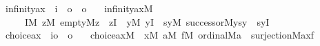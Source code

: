 \begin{isabellebody}
\isanewline
\isanewline
{}\isamarkupfalse%
\isanewline
\ \ infinity{\isacharunderscore}{\kern0pt}ax\ {\isacharcolon}{\kern0pt}{\isacharcolon}{\kern0pt}\ {\isachardoublequoteopen}{\isacharparenleft}{\kern0pt}i\ {\isasymRightarrow}\ o{\isacharparenright}{\kern0pt}\ {\isasymRightarrow}\ o{\isachardoublequoteclose}\ \isanewline
\ \ {\isachardoublequoteopen}infinity{\isacharunderscore}{\kern0pt}ax{\isacharparenleft}{\kern0pt}M{\isacharparenright}{\kern0pt}\ {\isasymequiv}\isanewline
\ \ \ \ \ \ {\isacharparenleft}{\kern0pt}{\isasymexists}I{\isacharbrackleft}{\kern0pt}M{\isacharbrackright}{\kern0pt}{\isachardot}{\kern0pt}\ {\isacharparenleft}{\kern0pt}{\isasymexists}z{\isacharbrackleft}{\kern0pt}M{\isacharbrackright}{\kern0pt}{\isachardot}{\kern0pt}\ empty{\isacharparenleft}{\kern0pt}M{\isacharcomma}{\kern0pt}z{\isacharparenright}{\kern0pt}\ {\isasymand}\ z{\isasymin}I{\isacharparenright}{\kern0pt}\ {\isasymand}\ {\isacharparenleft}{\kern0pt}{\isasymforall}y{\isacharbrackleft}{\kern0pt}M{\isacharbrackright}{\kern0pt}{\isachardot}{\kern0pt}\ y{\isasymin}I\ {\isasymlongrightarrow}\ {\isacharparenleft}{\kern0pt}{\isasymexists}sy{\isacharbrackleft}{\kern0pt}M{\isacharbrackright}{\kern0pt}{\isachardot}{\kern0pt}\ successor{\isacharparenleft}{\kern0pt}M{\isacharcomma}{\kern0pt}y{\isacharcomma}{\kern0pt}sy{\isacharparenright}{\kern0pt}\ {\isasymand}\ sy{\isasymin}I{\isacharparenright}{\kern0pt}{\isacharparenright}{\kern0pt}{\isacharparenright}{\kern0pt}{\isachardoublequoteclose}\isanewline
\isanewline
{}\isamarkupfalse%
\isanewline
\ \ choice{\isacharunderscore}{\kern0pt}ax\ {\isacharcolon}{\kern0pt}{\isacharcolon}{\kern0pt}\ {\isachardoublequoteopen}{\isacharparenleft}{\kern0pt}i{\isasymRightarrow}o{\isacharparenright}{\kern0pt}\ {\isasymRightarrow}\ o{\isachardoublequoteclose}\ \isanewline
\ \ {\isachardoublequoteopen}choice{\isacharunderscore}{\kern0pt}ax{\isacharparenleft}{\kern0pt}M{\isacharparenright}{\kern0pt}\ {\isasymequiv}\ {\isasymforall}x{\isacharbrackleft}{\kern0pt}M{\isacharbrackright}{\kern0pt}{\isachardot}{\kern0pt}\ {\isasymexists}a{\isacharbrackleft}{\kern0pt}M{\isacharbrackright}{\kern0pt}{\isachardot}{\kern0pt}\ {\isasymexists}f{\isacharbrackleft}{\kern0pt}M{\isacharbrackright}{\kern0pt}{\isachardot}{\kern0pt}\ ordinal{\isacharparenleft}{\kern0pt}M{\isacharcomma}{\kern0pt}a{\isacharparenright}{\kern0pt}\ {\isasymand}\ surjection{\isacharparenleft}{\kern0pt}M{\isacharcomma}{\kern0pt}a{\isacharcomma}{\kern0pt}x{\isacharcomma}{\kern0pt}f{\isacharparenright}{\kern0pt}{\isachardoublequoteclose}\isanewline

\end{isabellebody}
